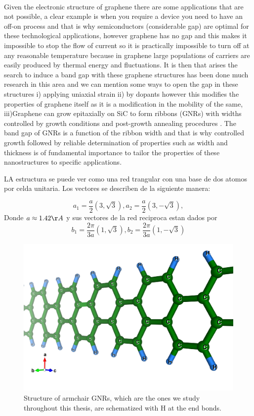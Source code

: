 \\
Given the electronic structure of graphene there are some applications that are not possible, a clear example is when you require a device you need to have an off-on process and that is why semiconductors (considerable gap) are optimal for these technological applications, however graphene has no gap and this makes it impossible to stop the flow of current so it is practically impossible to turn off at any reasonable temperature because in graphene large populations of carriers are easily produced by thermal energy and fluctuations. It is then that arises the search to induce a band gap with these graphene structures has been done much research in this area and we can mention some ways to open the gap in these structures i) applying uniaxial strain \cite{ni2008uniaxial}  ii) by dopants however this modifies the properties of graphene itself as it is a modification in the mobility of the same, iii)Graphene can grow epitaxially on SiC to form ribbons (GNRs) with widths controlled by growth conditions and post-growth annealing procedures \cite{celis2016graphene,baringhaus2014exceptional,sprinkle2010scalable}. The band gap of GNRs is a function of the ribbon width and that is why controlled growth followed by reliable determination of properties such as width and thickness is of fundamental importance to tailor the properties of these nanostructures to specific applications\cite{flores2021optical}.

LA estructura se puede ver como una red trangular con una base de dos atomos por celda unitaria. Los vectores se describen de la siguiente manera: 

\begin{equation}
	a_{1}=\frac{a}{2}(3, \sqrt{3}), 
	a_{2}=\frac{a}{2}(3, -\sqrt{3}),
\end{equation}
 Donde $a\approx 1.42\AA$ y sus vectores de la red reciproca estan dados por 
 \begin{equation}
	b_{1}=\frac{2 \pi}{3a}(1, \sqrt{3}), b_{2}=\frac{2 \pi}{3a}(1,-\sqrt{3})
 \end{equation}

\begin{figure}[h!]
	\centering
	\includegraphics[width=0.80\linewidth]{FIGURES/Physical_Background/GNR-1}
	\caption{Structure of armchair GNRs, which are the ones we study throughout this thesis, are schematized with H at the end bonds. }
	\label{fig:introfig32}
\end{figure}


